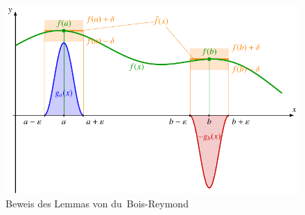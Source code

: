 %
%
%
\begin{figure}
\centering
\includegraphics{chapters/030-nichtdiff/images/dbr.pdf}
\caption{Beweis des Lemmas von du~Bois-Reymond
\label{buch:nichtdiff:fig:proof-dbr}}
\end{figure}
